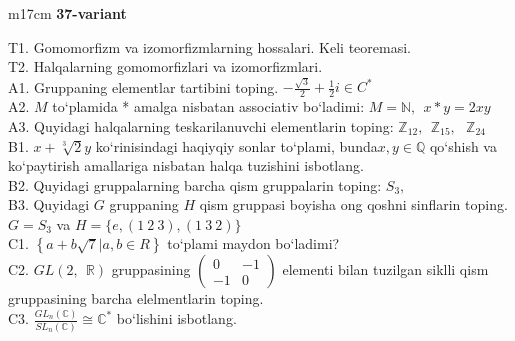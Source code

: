 \documentclass{article}
\begin{document}
\begin{tabular}{m{17cm}}
\textbf{37-variant}
\newline

T1. Gomomorfizm va izomorfizmlarning hossalari. Keli teoremasi. \\
T2. Halqalarning gomomorfizlari va izomorfizmlari. \\
A1. Gruppaning elementlar tartibini toping. \(- \frac{\sqrt{3}}{2} + \frac{1}{2}i \in C^{*}\) \\
A2. \(M\) to`plamida * amalga nisbatan associativ bo`ladimi: \(M\mathbb{= N},\ \ x*y = 2xy\) \\
A3. Quyidagi halqalarning teskarilanuvchi elementlarin toping: \(\mathbb{Z}_{12},\ \ \mathbb{Z}_{15},\ \ \ \mathbb{Z}_{24}\) \\
B1. \(x + \sqrt[3]{2}y\) ko`rinisindagi haqiyqiy sonlar to`plami, bunda\(x,y\mathbb{\in Q}\) qo`shish va ko`paytirish amallariga nisbatan halqa tuzishini isbotlang. \\
B2. Quyidagi gruppalarning barcha qism gruppalarin toping: \(S_{3},\) \\
B3. Quyidagi \(G\) gruppaning \(H\) qism gruppasi boyisha o\textquotesingle ng qo\textquotesingle shni sinflarin toping. \(G = S_{3}\) va \(H = \{ e,(1\ 2\ 3),(1\ 3\ 2)\}\) \\
C1. \(\left\{ a + b\sqrt{7}|a,b \in R \right\}\) to`plami maydon bo`ladimi? \\
C2. \(GL(2,\mathbb{\ \ R})\) gruppasining \(\begin{pmatrix}
0 & - 1 \\
 - 1 & 0
\end{pmatrix}\) elementi bilan tuzilgan siklli qism gruppasining barcha elelmentlarin toping. \\
C3. \(\frac{GL_{n}(\mathbb{C})}{SL_{n}(\mathbb{C})} \cong \mathbb{C}^{*}\) bo`lishini isbotlang. \\

\end{tabular}
\vspace{1cm}
\end{document}
